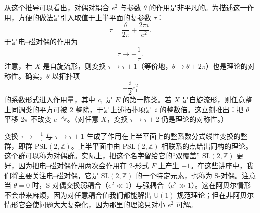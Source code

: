 \documentclass[11pt,a4paper,UTF8]{ctexart}
\begin{document}

从这个推导可以看出，对偶对耦合 $e^{2}$ 与参数 $\theta$ 的作用是非平凡的。为描述这一作用，方便的做法是引入取值于上半平面的复参数 $\tau$：
\[
    \tau=\frac{\theta}{2\pi}+\frac{2\pi i}{e^{2}} .
\]
于是电–磁对偶的作用为
\[
    \tau\to-\frac{1}{\tau}.
\]
注意，若 $X$ 是自旋流形，则变换 $\tau\to\tau+1$（等价地，$\theta\to\theta+2\pi$）也是理论的对称性。确实，$\theta$ 以拓扑项
\[
    -\frac{i}{2}c_{1}^{2}
\]
的系数形式进入作用量，其中 $c_{1}$ 是 $E$ 的第一陈类。若 $X$ 是自旋流形，则任意整上同调类的平方可被 $2$ 整除，于是上述拓扑项是 $i$ 的整数倍。这立刻推出：把 $\theta$ 平移 $2\pi$ 不改变 $e^{-S_{E}}$。（对任意 $X$，变换 $\tau\to\tau+2$ 仍是理论的对称性。）



变换 $\tau\to-\frac{1}{\tau}$ 与 $\tau\to\tau+1$ 生成了作用在上半平面上的整系数分式线性变换的整群，即群 $\mathrm{PSL}(2,\mathbb{Z})$。上半平面中由 $\mathrm{PSL}(2,\mathbb{Z})$ 相联系的点给出同构的理论。这个群可以称为对偶群。实际上，把这个名字留给它的“双覆盖” $\mathrm{SL}(2,\mathbb{Z})$ 更好，因为把电–磁对偶作用两次会作用在 2-形式 $F$ 上产生 $-1$。在这些讲座中，我们将主要关注电–磁对偶，它是 $\mathrm{SL}(2,\mathbb{Z})$ 的一个特定元素，也称为 S-对偶。注意当 $\theta=0$ 时，S-对偶交换弱耦合（$e^{2}\ll 1$）与强耦合（$e^{2}\gg 1$）。这在阿贝尔情形不会带来麻烦，因为对任意耦合值我们都能解出 $\mathrm{U}(1)$ 规范理论；但在非阿贝尔情形它会使问题大大复杂化，因为那里的理论只对小 $e^{2}$ 可解。
\end{document}
